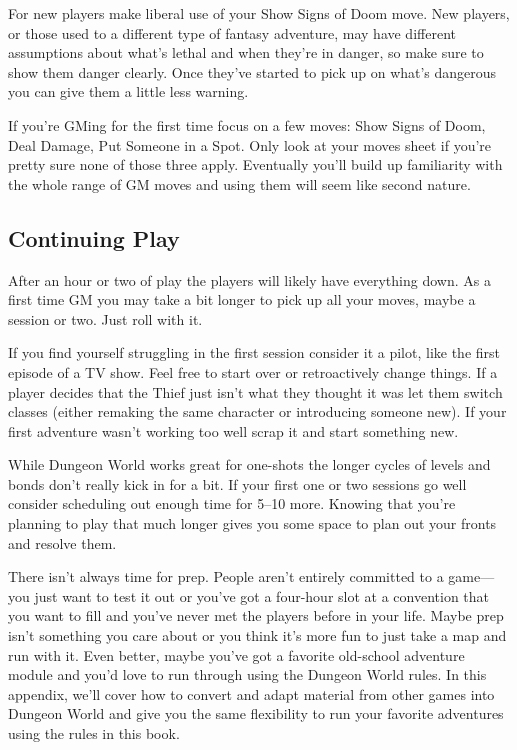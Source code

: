 For new players make liberal use of your Show Signs of Doom move. New players, or those used to a different type of fantasy adventure, may have different assumptions about what's lethal and when they're in danger, so make sure to show them danger clearly. Once they've started to pick up on what's dangerous you can give them a little less warning.

 

If you're GMing for the first time focus on a few moves: Show Signs of Doom, Deal Damage, Put Someone in a Spot. Only look at your moves sheet if you're pretty sure none of those three apply. Eventually you'll build up familiarity with the whole range of GM moves and using them will seem like second nature.

 
\subsection{Continuing Play}   
 

After an hour or two of play the players will likely have everything down. As a first time GM you may take a bit longer to pick up all your moves, maybe a session or two. Just roll with it.

 

If you find yourself struggling in the first session consider it a pilot, like the first episode of a TV show. Feel free to start over or retroactively change things. If a player decides that the Thief just isn't what they thought it was let them switch classes (either remaking the same character or introducing someone new). If your first adventure wasn't working too well scrap it and start something new.

 

While Dungeon World works great for one-shots the longer cycles of levels and bonds don't really kick in for a bit. If your first one or two sessions go well consider scheduling out enough time for 5–10 more. Knowing that you're planning to play that much longer gives you some space to plan out your fronts and resolve them.

 





 



There isn’t always time for prep. People aren’t entirely committed to a game—you just want to test it out or you’ve got a four-hour slot at a convention that you want to fill and you’ve never met the players before in your life. Maybe prep isn’t something you care about or you think it’s more fun to just take a map and run with it. Even better, maybe you’ve got a favorite old-school adventure module and you’d love to run through using the Dungeon World rules. In this appendix, we’ll cover how to convert and adapt material from other games into Dungeon World and give you the same flexibility to run your favorite adventures using the rules in this book.

